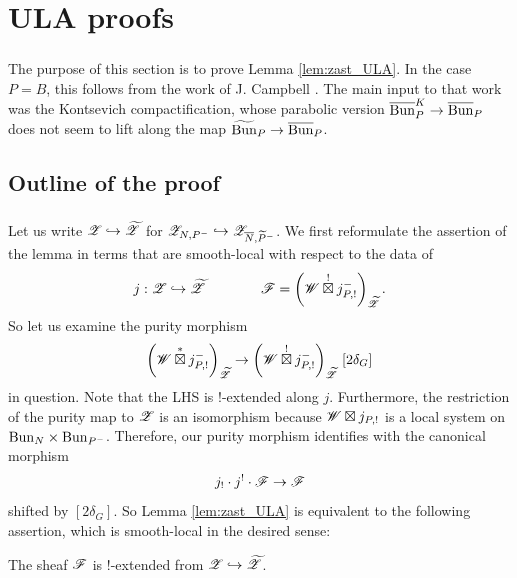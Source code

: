 \section{ULA proofs}
\label{section:ULA}

\subsubsection{} The purpose of this section is to prove Lemma \ref{lem:zast_ULA}. In the case $P = B$, this follows from the work of J. Campbell \cite{justin_Kontsevich}. The main input to that work was the Kontsevich compactification, whose parabolic version $\overline{\mathrm{Bun}}_P^K \to \overline{\mathrm{Bun}}_P$ does not seem to lift along the map $\widetilde{\mathrm{Bun}}_P \to \overline{\mathrm{Bun}}_P$.

\subsection{Outline of the proof}

\subsubsection{} Let us write $\mathscr{Z} \hookrightarrow {\widetilde{\mathscr{Z}}}$ for $\mathscr{Z}_{N,P^-} \hookrightarrow \mathscr{Z}_{\overline{N}, \widetilde{P}^-}$. We first reformulate the assertion of the lemma in terms that are smooth-local with respect to the data of
  \[j : \mathscr{Z}  \hookrightarrow  {\widetilde{\mathscr{Z}}}  \qquad  \qquad \mathscr{F} = \left( \mathscr{W} \overset{!}{\boxtimes} j_{P,!}^- \right)_{\widetilde{\mathscr{Z}}}.\]
So let us examine the purity morphism
    \[
    \left( \mathscr{W} \overset{*}{\boxtimes} j_{P,!}^- \right)_{\widetilde{\mathscr{Z}}} 
    \to \left( \mathscr{W} \overset{!}{\boxtimes} j_{P,!}^- \right)_{\widetilde{\mathscr{Z}}} \, [2 \delta_G]
    \]
in question. Note that the LHS is $!$-extended along $j$. Furthermore, the restriction of the purity map to $\mathscr{Z}$ is an isomorphism because $\mathscr{W} \boxtimes j_{P,!}$ is a local system on $\mathrm{Bun}_N \times \mathrm{Bun}_{P^-}$. Therefore, our purity morphism identifies with the canonical morphism
\begin{equation}
\label{eqn:zast_ULA_rewrite}
    j_! \cdot j^! \cdot \mathscr{F} \to \mathscr{F}
\end{equation}
shifted by $[2 \delta_G]$. So Lemma \ref{lem:zast_ULA} is equivalent to the following assertion, which is smooth-local in the desired sense:

\begin{lemma}
\label{lemma:zast_!_extended}
The sheaf $\mathscr{F}$ is $!$-extended from $\mathscr{Z} \hookrightarrow {\widetilde{\mathscr{Z}}}$.
\end{lemma}

